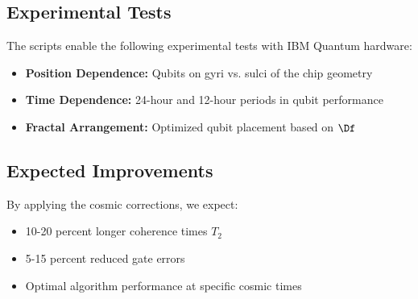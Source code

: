 \subsection{Experimental Tests}

The scripts enable the following experimental tests with IBM Quantum hardware:

\begin{itemize}
	\item \textbf{Position Dependence:} Qubits on gyri vs. sulci of the chip geometry
	\item \textbf{Time Dependence:} 24-hour and 12-hour periods in qubit performance
	\item \textbf{Fractal Arrangement:} Optimized qubit placement based on $\Df$
\end{itemize}

\subsection{Expected Improvements}

By applying the cosmic corrections, we expect:

\begin{itemize}
	\item 10-20 percent longer coherence times $T_2$
	\item 5-15 percent reduced gate errors
	\item Optimal algorithm performance at specific cosmic times
\end{itemize}

